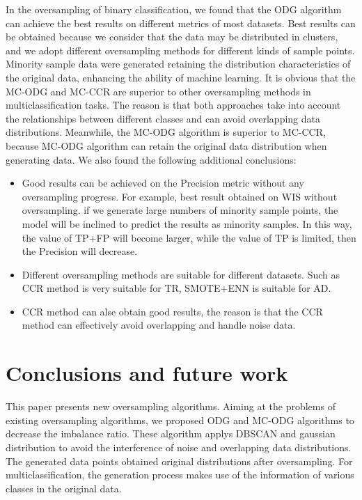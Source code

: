 \documentclass[runningheads]{llncs}
\begin{document}
In the oversampling of binary classification, 
we found that the ODG algorithm can achieve the best 
results on different metrics of most datasets.
Best results can be obtained because we consider 
that the data may be distributed in clusters, 
and we adopt different oversampling methods for different kinds of sample points.
Minority sample data were generated retaining 
the distribution characteristics of the original data, 
enhancing the ability of machine learning.
It is obvious that the MC-ODG and MC-CCR are superior 
to other oversampling methods in  
multiclassification tasks. 
The reason is that both approaches take into account 
the relationships between different classes and
can avoid overlapping data distributions.
Meanwhile, the MC-ODG algorithm is superior to MC-CCR, because MC-ODG
algorithm can retain the original data distribution when generating data.
We also found the following additional conclusions:
\begin{itemize}
  \item Good results can be achieved on the Precision metric without any oversampling progress. 
  For example, best result obtained on WIS without oversampling.
   if we generate large numbers of minority sample points, 
   the model will be inclined to predict the results as minority samples. In this way, 
   the value of TP+FP will become larger, while the value of TP is limited, then the Precision will decrease.
  \item Different oversampling methods are suitable for different datasets. 
  Such as CCR method is very suitable for TR, SMOTE+ENN is suitable for AD.
  \item CCR method can alse obtain good results, 
  the reason is that the CCR method can effectively avoid overlapping and handle noise data.
\end{itemize}

\section{Conclusions and future work}
This paper presents new oversampling algorithms.
Aiming at the problems of existing oversampling algorithms, we proposed ODG and MC-ODG algorithms
to decrease the imbalance ratio. 
These algorithm applys DBSCAN and gaussian distribution to avoid the interference of noise
and overlapping data distributions. The generated data points 
obtained original distributions after oversampling.
For multiclassification,
the generation process makes use of the 
information of various classes in the original data.
\end{document}
